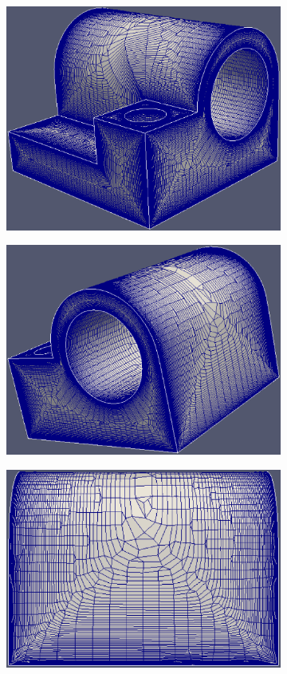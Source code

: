\documentclass[conf]{new-aiaa}
\begin{document}
\begin{figure}[hbt!]
\centering
\begin{subfigure}{.33\textwidth}
  \centering
  \includegraphics[width=.9\linewidth]{meshCases/joint-x0.004-g1.04-a5/oblique.eps}
  \caption{}
  \label{fig-joint-oblique}
\end{subfigure}%
\begin{subfigure}{.33\textwidth}
  \centering
  \includegraphics[width=.9\linewidth]{meshCases/joint-x0.004-g1.04-a5/oblique1.eps}
  \caption{}
  \label{fig-joint-oblique1}
\end{subfigure}%
\begin{subfigure}{.33\textwidth}
  \centering
  \includegraphics[width=.9\linewidth]{meshCases/joint-x0.004-g1.04-a5/side.eps}

\end{subfigure}
\end{figure}
\end{document}
